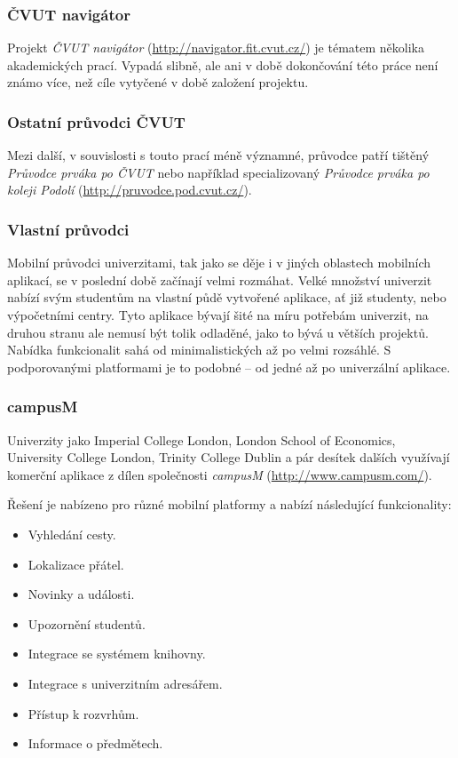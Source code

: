\subsubsection{ČVUT navigátor}
Projekt \emph{ČVUT navigátor} (\url{http://navigator.fit.cvut.cz/}) je tématem několika akademických prací. Vypadá slibně, ale ani v době dokončování této práce není známo více, než cíle vytyčené v době založení projektu.

\subsubsection{Ostatní průvodci ČVUT}
Mezi další, v souvislosti s touto prací méně významné, průvodce patří tištěný \emph{Průvodce prváka po ČVUT} \cite{PruvodcePrvaka} nebo například specializovaný \emph{Průvodce prváka po koleji Podolí} (\url{http://pruvodce.pod.cvut.cz/}).

\subsubsection{Vlastní průvodci}
Mobilní průvodci univerzitami, tak jako se děje i v jiných oblastech mobilních aplikací, se v poslední době začínají velmi rozmáhat. Velké množství univerzit nabízí svým studentům na vlastní půdě vytvořené aplikace, ať již studenty, nebo výpočetními centry. Tyto aplikace bývají šité na míru potřebám univerzit, na druhou stranu ale nemusí být tolik odladěné, jako to bývá u větších projektů. Nabídka funkcionalit sahá od minimalistických až po velmi rozsáhlé. S podporovanými platformami je to podobné -- od jedné až po univerzální aplikace.

\subsubsection{campusM}
Univerzity jako Imperial College London, London School of Economics, University College London, Trinity College Dublin a pár desítek dalších využívají komerční aplikace z dílen společnosti \emph{campusM} (\url{http://www.campusm.com/}).

Řešení je nabízeno pro různé mobilní platformy a nabízí následující funkcionality:
\begin{itemize}
\item Vyhledání cesty.
\item Lokalizace přátel.
\item Novinky a události.
\item Upozornění studentů.
\item Integrace se systémem knihovny.
\item Integrace s univerzitním adresářem.
\item Přístup k rozvrhům.
\item Informace o předmětech.
\end{itemize}

